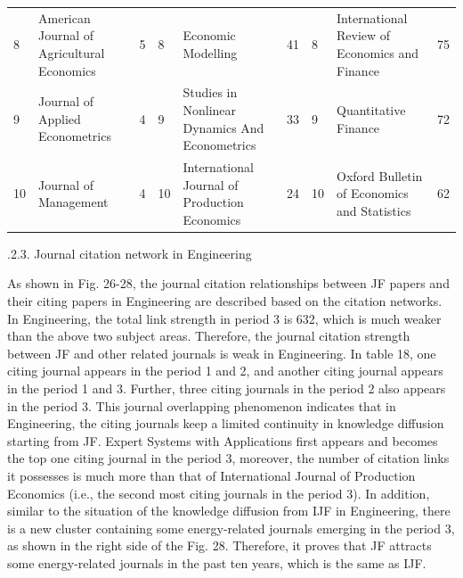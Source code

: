 \documentclass[11pt,a4paper]{elsarticle} %
\begin{document}
\begin{landscape}
\begin{table}[!htbp]
{\begin{tabular}{p{1.5cm}<{\centering} p{6cm}<{\centering} p{1.5cm}<{\centering}|p{1.5cm}<{\centering} p{6cm}<{\centering} p{1.5cm}<{\centering}|p{1.5cm}<{\centering} p{6cm}<{\centering} p{1.5cm}<{\centering}}
8 & American Journal of Agricultural Economics & 5 & 8 & Economic Modelling & 41 & 8 & International Review of Economics and Finance & 75\\
9 & Journal of Applied Econometrics & 4 & 9 & Studies in Nonlinear Dynamics And Econometrics & 33 & 9 & Quantitative Finance & 72\\
10 & Journal of Management & 4 & 10 & International Journal of Production Economics & 24 & 10 & Oxford Bulletin of Economics and Statistics & 62\\
  \hline
  \hline
    \end{tabular}}
\end{table}
\end{landscape}

.2.3. Journal citation network in Engineering

As shown in Fig. 26-28, the journal citation relationships between JF
papers and their citing papers in Engineering are described based on the
citation networks. In Engineering, the total link strength in period 3
is 632, which is much weaker than the above two subject areas.
Therefore, the journal citation strength between JF and other related
journals is weak in Engineering. In table 18, one citing journal appears
in the period 1 and 2, and another citing journal appears in the period
1 and 3. Further, three citing journals in the period 2 also appears in
the period 3. This journal overlapping phenomenon indicates that in
Engineering, the citing journals keep a limited continuity in knowledge
diffusion starting from JF. Expert Systems with Applications first
appears and becomes the top one citing journal in the period 3,
moreover, the number of citation links it possesses is much more than
that of International Journal of Production Economics (i.e., the second
most citing journals in the period 3). In addition, similar to the
situation of the knowledge diffusion from IJF in Engineering, there is a
new cluster containing some energy-related journals emerging in the
period 3, as shown in the right side of the Fig. 28. Therefore, it
proves that JF attracts some energy-related journals in the past ten
years, which is the same as IJF.
\end{document}
